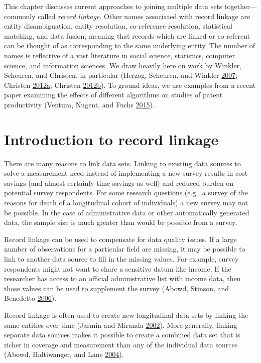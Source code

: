 \documentclass[]{krantz}
\begin{document}
This chapter discusses current approaches to joining multiple data sets
together---commonly called \emph{record linkage}. Other names associated
with record linkage are entity disambiguation, entity resolution,
co-reference resolution, statistical matching, and data fusion, meaning
that records which are linked or co-referent can be thought of as
corresponding to the same underlying entity. The number of names is
reflective of a vast literature in social science, statistics, computer
science, and information sciences. We draw heavily here on work by
Winkler, Scheuren, and Christen, in particular (Herzog, Scheuren, and
Winkler \protect\hyperlink{ref-herzog2007data}{2007}; Christen
\protect\hyperlink{ref-christen2012survey}{2012}\protect\hyperlink{ref-christen2012survey}{a};
Christen
\protect\hyperlink{ref-christen2012data}{2012}\protect\hyperlink{ref-christen2012data}{b}).
To ground ideas, we use examples from a recent paper examining the
effects of different algorithms on studies of patent productivity
(Ventura, Nugent, and Fuchs
\protect\hyperlink{ref-ventura2015seeing}{2015}).

\section{Introduction to record linkage}\label{sec:recordlinkage}

There are many reasons to link data sets. Linking to existing data
sources to solve a measurement need instead of implementing a new survey
results in cost savings (and almost certainly time savings as well) and
reduced burden on potential survey respondents. For some research
questions (e.g., a survey of the reasons for death of a longitudinal
cohort of individuals) a new survey may not be possible. In the case of
administrative data or other automatically generated data, the sample
size is much greater than would be possible from a survey.

Record linkage can be used to compensate for data quality issues. If a
large number of observations for a particular field are missing, it may
be possible to link to another data source to fill in the missing
values. For example, survey respondents might not want to share a
sensitive datum like income. If the researcher has access to an official
administrative list with income data, then those values can be used to
supplement the survey (Abowd, Stinson, and Benedetto
\protect\hyperlink{ref-abowd2006final}{2006}).

Record linkage is often used to create new longitudinal data sets by
linking the same entities over time (Jarmin and Miranda
\protect\hyperlink{ref-jarmin2002longitudinal}{2002}). More generally,
linking separate data sources makes it possible to create a combined
data set that is richer in coverage and measurement than any of the
individual data sources (Abowd, Haltiwanger, and Lane
\protect\hyperlink{ref-abowd2004integrated}{2004}).
\end{document}
